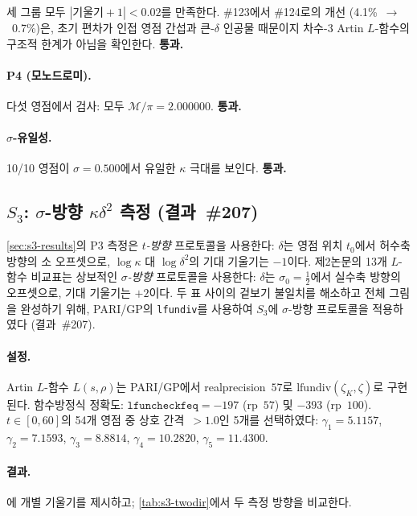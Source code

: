 \documentclass[11pt, a4paper]{article}
\theoremstyle{plain}
\theoremstyle{definition}
\newcommand{\abs}[1]{\left|#1\right|}
\newcommand{\kap}{\kappa}             %
\newcommand{\mono}{\mathcal{M}}       %
\begin{document}
세 그룹 모두 $\abs{\text{기울기}+1} < 0.02$를 만족한다.
\#123에서 \#124로의 개선 (4.1\%~$\to$~0.7\%)은, 초기 편차가
인접 영점 간섭과 큰-$\delta$ 인공물 때문이지
차수-3 Artin $L$-함수의 구조적 한계가 아님을 확인한다.
\textbf{통과.}

\paragraph{P4 (모노드로미).}
다섯 영점에서 검사: 모두 $\mono/\pi = 2.000000$.
\textbf{통과.}

\paragraph{$\sigma$-유일성.}
10/10 영점이 $\sigma = 0.500$에서 유일한 $\kap$ 극대를 보인다.
\textbf{통과.}


\subsection{$S_{3}$: $\sigma$-방향 $\kap\delta^{2}$ 측정 (결과~\#207)}
\label{sec:s3-sigma}

\cref{sec:s3-results}의 P3 측정은 \emph{$t$-방향} 프로토콜을 사용한다:
$\delta$는 영점 위치 $t_{0}$에서 허수축 방향의 소 오프셋으로,
$\log\kap$ 대 $\log\delta^{2}$의 기대 기울기는 $-1$이다.
제2논문의 13개 $L$-함수 비교표는 상보적인 \emph{$\sigma$-방향} 프로토콜을 사용한다:
$\delta$는 $\sigma_{0}=\tfrac{1}{2}$에서 실수축 방향의 오프셋으로,
기대 기울기는 $+2$이다. 두 표 사이의 겉보기 불일치를 해소하고
전체 그림을 완성하기 위해, PARI/GP의 \texttt{lfundiv}를 사용하여
$S_{3}$에 $\sigma$-방향 프로토콜을 적용하였다 (결과~\#207).

\paragraph{설정.}
Artin $L$-함수 $L(s,\rho)$는 PARI/GP에서
realprecision~$57$로 $\mathrm{lfundiv}(\zeta_{K},\zeta)$로 구현된다.
함수방정식 정확도: $\texttt{lfuncheckfeq}=-197$ (rp~$57$) 및
$-393$ (rp~$100$). $t\in[0,60]$의 54개 영점 중 상호 간격~${>}1.0$인
5개를 선택하였다: $\gamma_{1}=5.1157$, $\gamma_{2}=7.1593$,
$\gamma_{3}=8.8814$, $\gamma_{4}=10.2820$, $\gamma_{5}=11.4300$.

\paragraph{결과.}
에 개별 기울기를 제시하고;
\cref{tab:s3-twodir}에서 두 측정 방향을 비교한다.
\end{document}
